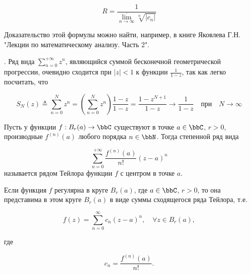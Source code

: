 \begin{equation} \label{3}
R = \frac{1}{\overline{\lim\limits_{n \to \infty}} \sqrt[n]{|c_n|}}
\end{equation}

Доказательство этой формулы можно найти, например, в книге Яковлева Г.Н. "Лекции по математическому анализу. Часть 2".

\begin{exmpl} \label{exmpl1}
. Ряд вида $\sum\limits_{n = 0}^{+\infty} z^n$, являющийся суммой бесконечной геометрической прогрессии, очевидно сходится при $|z| < 1$ к функции $\frac{1}{1 - z}$, так как легко посчитать, что

$$
S_N(z) \triangleq \sum\limits_{n = 0}^{N} z^n = \left( \sum\limits_{n = 0}^{N} z^n \right) \frac{1 - z}{1 - z} = \frac{1 - z^{N + 1}}{1 - z} \to \frac{1}{1 - z} \quad \text{при} \quad N \to \infty
$$

\end{exmpl} 

\begin{defn}
Пусть у функции $f : B_r(a) \to \bbC$ существуют в точке $a \in \bbC$, $r > 0$, производные $f^{(n)}(a)$ любого порядка $n \in \bbN$. Тогда степенной ряд вида

\begin{equation} \label{4}
\sum\limits_{n = 0}^{+\infty} \frac{f^{(n)}(a)}{n!} (z - a)^n
\end{equation}
называется $\textit{рядом Тейлора функции f}$ с центром в точке $a$.
\end{defn}

\begin{thm}
Если функция $f$ регулярна в круге $B_r(a)$, где $a \in \bbC$, $r > 0$, то она представима в этом круге $B_r(a)$ в виде суммы сходящегося ряда Тейлора, т.е.

\begin{equation} \label{5}
f(z) = \sum\limits_{n = 0}^{\infty} c_n(z - a)^n, \quad \forall z \in B_r(a),
\end{equation}

где

\begin{equation} \label{6}
c_n = \frac{f^{(n)}(a)}{n!}.
\end{equation}

\end{thm}

